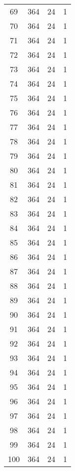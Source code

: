 \begin{longtable}[!]{c|ccc}
	69	& 364	& 24	& 1	\\
	70	& 364	& 24	& 1	\\
	71	& 364	& 24	& 1	\\
	72	& 364	& 24	& 1	\\
	73	& 364	& 24	& 1	\\
	74	& 364	& 24	& 1	\\
	75	& 364	& 24	& 1	\\
	76	& 364	& 24	& 1	\\
	77	& 364	& 24	& 1	\\
	78	& 364	& 24	& 1	\\
	79	& 364	& 24	& 1	\\
	80	& 364	& 24	& 1	\\
	81	& 364	& 24	& 1	\\
	82	& 364	& 24	& 1	\\
	83	& 364	& 24	& 1	\\
	84	& 364	& 24	& 1	\\
	85	& 364	& 24	& 1	\\
	86	& 364	& 24	& 1	\\
	87	& 364	& 24	& 1	\\
	88	& 364	& 24	& 1	\\
	89	& 364	& 24	& 1	\\
	90	& 364	& 24	& 1	\\
	91	& 364	& 24	& 1	\\
	92	& 364	& 24	& 1	\\
	93	& 364	& 24	& 1	\\
	94	& 364	& 24	& 1	\\
	95	& 364	& 24	& 1	\\
	96	& 364	& 24	& 1	\\
	97	& 364	& 24	& 1	\\
	98	& 364	& 24	& 1	\\
	99	& 364	& 24	& 1	\\
	100	& 364	& 24	& 1	\\
\end{longtable}


